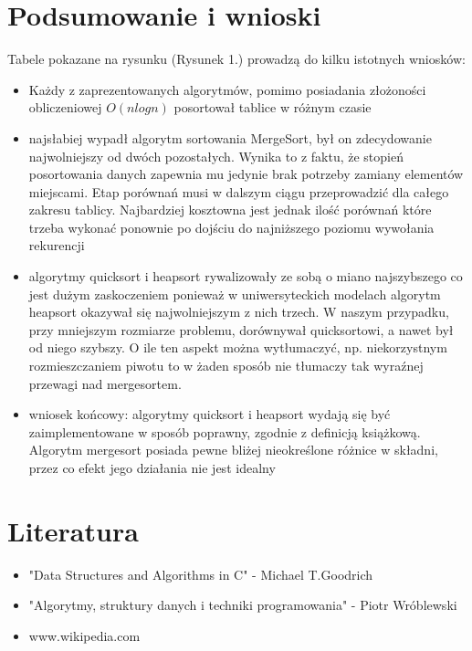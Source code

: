 \documentclass[10pt,a4paper]{article} %
\begin{document}
	\clearpage
	\section{Podsumowanie i wnioski}
	Tabele pokazane na rysunku (Rysunek 1.) prowadzą do kilku istotnych wniosków:
	\begin{itemize}
		\item Każdy z zaprezentowanych algorytmów, pomimo posiadania złożoności obliczeniowej $ O (n log n) $ posortował tablice w różnym czasie
		\item najsłabiej wypadł algorytm sortowania MergeSort, był on zdecydowanie najwolniejszy od dwóch pozostałych. Wynika to z faktu, że stopień posortowania danych zapewnia mu jedynie brak potrzeby zamiany elementów miejscami. Etap porównań musi w dalszym ciągu przeprowadzić dla całego zakresu tablicy. Najbardziej kosztowna jest jednak ilość porównań które trzeba wykonać ponownie po dojściu do najniższego poziomu wywołania rekurencji
		\item algorytmy quicksort i heapsort rywalizowały ze sobą o miano najszybszego co jest dużym zaskoczeniem ponieważ w uniwersyteckich modelach algorytm heapsort okazywał się najwolniejszym z nich trzech. W naszym przypadku, przy mniejszym rozmiarze problemu, dorównywał quicksortowi, a nawet był od niego szybszy. O ile ten aspekt można wytłumaczyć, np. niekorzystnym rozmieszczaniem piwotu to w żaden sposób nie tłumaczy tak wyraźnej przewagi nad mergesortem.
		\item wniosek końcowy: algorytmy quicksort i heapsort wydają się być zaimplementowane w sposób poprawny, zgodnie z definicją książkową. Algorytm mergesort posiada pewne bliżej nieokreślone różnice w składni, przez co efekt jego działania nie jest idealny
	\end{itemize}
	\section{Literatura}
	\begin{itemize}
		\item "Data Structures and Algorithms in C" - Michael T.Goodrich
		\item "Algorytmy, struktury danych i techniki programowania" - Piotr Wróblewski
		\item www.wikipedia.com
	\end{itemize}
	
	
	
	
	
	


		
\end{document}
